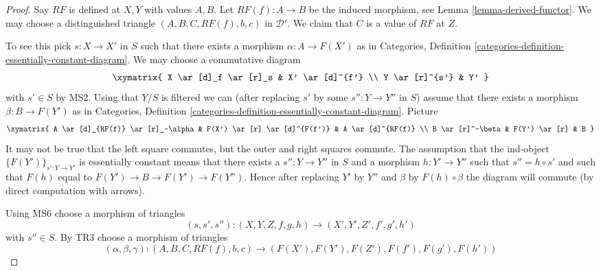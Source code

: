 \begin{proof}
Say $RF$ is defined at $X, Y$ with values $A, B$.
Let $RF(f) : A \to B$ be the induced morphism, see
Lemma \ref{lemma-derived-functor}.
We may choose a distinguished triangle
$(A, B, C, RF(f), b, c)$
in $\mathcal{D}'$. We claim that $C$ is a value of $RF$ at $Z$.

\medskip\noindent
To see this pick $s : X \to X'$ in $S$ such that there exists a morphism
$\alpha : A \to F(X')$ as in
Categories,
Definition \ref{categories-definition-essentially-constant-diagram}.
We may choose a commutative diagram
$$
\xymatrix{
X \ar[d]_f \ar[r]_s & X' \ar[d]^{f'} \\
Y \ar[r]^{s'} & Y'
}
$$
with $s' \in S$ by MS2. Using that $Y/S$ is filtered we can (after replacing
$s'$ by some $s'' : Y \to Y''$ in $S$) assume that there exists
a morphism $\beta : B \to F(Y')$ as in
Categories,
Definition \ref{categories-definition-essentially-constant-diagram}.
Picture
$$
\xymatrix{
A \ar[d]_{RF(f)} \ar[r]_-\alpha &
F(X') \ar[r] \ar[d]^{F(f')} &
A \ar[d]^{RF(f)} \\
B \ar[r]^-\beta & F(Y') \ar[r] & B
}
$$
It may not be true that the left square commutes, but the outer and
right squares commute.
The assumption that the ind-object $\{F(Y')\}_{s' : Y \to Y'}$
is essentially constant means that there exists a $s'' : Y \to Y''$
in $S$ and a morphism $h : Y' \to Y''$ such that $s'' = h \circ s'$ and
such that $F(h)$ equal to $F(Y') \to B \to F(Y') \to F(Y'')$. Hence
after replacing $Y'$ by $Y''$ and $\beta$ by $F(h) \circ \beta$ the
diagram will commute (by direct computation with arrows).

\medskip\noindent
Using MS6 choose a morphism of triangles
$$
(s, s', s'') : (X, Y, Z, f, g, h) \longrightarrow (X', Y', Z', f', g', h')
$$
with $s'' \in S$. By TR3 choose a morphism of triangles
$$
(\alpha, \beta, \gamma) :
(A, B, C, RF(f), b, c)
\longrightarrow
(F(X'), F(Y'), F(Z'), F(f'), F(g'), F(h'))
$$


\end{proof}
